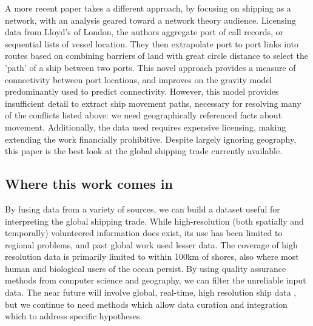 A more recent paper \citep{Kaluza2010} takes a different approach, by focusing on shipping as a network, with an analysis geared toward a network theory audience. Licensing data from Lloyd's of London, %
 the authors aggregate port of call records, or sequential lists of vessel location. They then extrapolate port to port links into routes based on combining barriers of land with great circle distance to select the 'path' of a ship between two ports. This novel approach provides a measure of connectivity between port locations, and improves on the gravity model predominantly used to predict connectivity. %
However, this model provides insufficient detail to extract ship movement paths, necessary for resolving many of the conflicts listed above: we need geographically referenced facts about movement. Additionally, the data used requires expensive licensing, making extending the work financially prohibitive. Despite largely ignoring geography, this paper is the best look at the global shipping trade currently available.



\subsection{Where this work comes in}

By fusing data from a variety of sources, we can build a dataset useful for interpreting the global shipping trade. While high-resolution (both spatially and temporally) volunteered information does exist, its use has been limited to regional problems, and past global work \citep{Corbett2007, Halpern2008} used lesser data. The coverage of high resolution data is primarily limited to within 100km of shores, also where most human and biological users of the ocean persist. %
 By using quality assurance methods from computer science and geography, %
  we can filter the unreliable input data. The near future will involve global, real-time, high resolution ship data \citep{JonesGoogle2012,carson2012satellite}, but we continue to need methods which allow data curation and integration which to address specific hypotheses.

